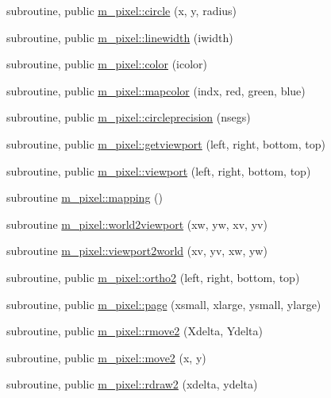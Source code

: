 \begin{DoxyCompactItemize}
subroutine, public \mbox{\hyperlink{namespacem__pixel_ab3b12cc498ed490014aa5fcc0bb278d2}{m\+\_\+pixel\+::circle}} (x, y, radius)
\item 
subroutine, public \mbox{\hyperlink{namespacem__pixel_a16379e283aaa99e2e0ba1eb26e93452d}{m\+\_\+pixel\+::linewidth}} (iwidth)
\item 
subroutine, public \mbox{\hyperlink{namespacem__pixel_a334bde41bc7b2db19b950b1271ba7463}{m\+\_\+pixel\+::color}} (icolor)
\item 
subroutine, public \mbox{\hyperlink{namespacem__pixel_a3422f51171f30979868a8075690da9f5}{m\+\_\+pixel\+::mapcolor}} (indx, red, green, blue)
\item 
subroutine, public \mbox{\hyperlink{namespacem__pixel_a68ca1be8f7a92ece6efce8d69987af9c}{m\+\_\+pixel\+::circleprecision}} (nsegs)
\item 
subroutine, public \mbox{\hyperlink{namespacem__pixel_a9f382cf8d3b69e11d1fdd2f2a4f59dea}{m\+\_\+pixel\+::getviewport}} (left, right, bottom, top)
\item 
subroutine, public \mbox{\hyperlink{namespacem__pixel_a43247343cd316e3aa075b44b5166e2e9}{m\+\_\+pixel\+::viewport}} (left, right, bottom, top)
\item 
subroutine \mbox{\hyperlink{namespacem__pixel_a84c841de62fc0addddeff305c4ede9d4}{m\+\_\+pixel\+::mapping}} ()
\item 
subroutine \mbox{\hyperlink{namespacem__pixel_a9d4aea8ae2eb15317b83fa03a11371b2}{m\+\_\+pixel\+::world2viewport}} (xw, yw, xv, yv)
\item 
subroutine \mbox{\hyperlink{namespacem__pixel_a9e23c9a3a5f3b1482986f067fbf8487f}{m\+\_\+pixel\+::viewport2world}} (xv, yv, xw, yw)
\item 
subroutine, public \mbox{\hyperlink{namespacem__pixel_a80dece6adac704024a5a76efee697770}{m\+\_\+pixel\+::ortho2}} (left, right, bottom, top)
\item 
subroutine, public \mbox{\hyperlink{namespacem__pixel_a6733a8657ca9f51b2648690dbae258c9}{m\+\_\+pixel\+::page}} (xsmall, xlarge, ysmall, ylarge)
\item 
subroutine, public \mbox{\hyperlink{namespacem__pixel_a9b0fb9ccafe605fd6daf50c74347ed3a}{m\+\_\+pixel\+::rmove2}} (Xdelta, Ydelta)
\item 
subroutine, public \mbox{\hyperlink{namespacem__pixel_ab5d4dc474ff84dc0f3f35f4a395979e0}{m\+\_\+pixel\+::move2}} (x, y)
\item 
subroutine, public \mbox{\hyperlink{namespacem__pixel_a664375b036092dbebe1bccdc67254e1d}{m\+\_\+pixel\+::rdraw2}} (xdelta, ydelta)

\end{DoxyCompactItemize}
